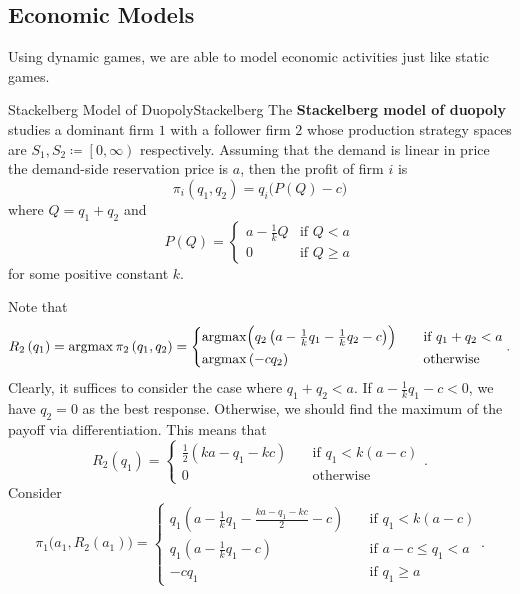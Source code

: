 \documentclass[math]{amznotes}
\theoremstyle{remark}
\DeclareMathOperator*{\argmax}{argmax}
\begin{document}
\subsection{Economic Models}
Using dynamic games, we are able to model economic activities just like static games. 
\begin{dfnbox}{Stackelberg Model of Duopoly}{Stackelberg}
    The {\color{red} \textbf{Stackelberg model of duopoly}} studies a dominant firm $1$ with a follower firm $2$ whose production strategy spaces are $S_1, S_2 \coloneqq \left[0, \infty\right)$ respectively. Assuming that the demand is linear in price the demand-side reservation price is $a$, then the profit of firm $i$ is 
    \begin{equation*}
        \pi_i\left(q_1, q_2\right) = q_i\bigl(P\left(Q\right) - c\bigr)
    \end{equation*}
    where $Q = q_1 + q_2$ and 
    \begin{equation*}
        P\left(Q\right) = \begin{cases}
            a - \frac{1}{k}Q & \textrm{if } Q < a \\
            0 & \textrm{if } Q \geq a
        \end{cases}
    \end{equation*}
    for some positive constant $k$.
\end{dfnbox}
Note that 
\begin{equation*}
    R_2\left(q_1\right) = \argmax \pi_2\left(q_1, q_2\right) = \begin{cases}
        \argmax \Bigl(q_2\left(a - \frac{1}{k}q_1 - \frac{1}{k}q_2 - c\right)\Bigr) & \quad\textrm{if } q_1 + q_2 < a \\
        \argmax \left(-cq_2\right) & \quad\textrm{otherwise}
    \end{cases}.
\end{equation*}
Clearly, it suffices to consider the case where $q_1 + q_2 < a$. If $a - \frac{1}{k}q_1 - c < 0$, we have $q_2 = 0$ as the best response. Otherwise, we should find the maximum of the payoff via differentiation. This means that 
\begin{equation*}
    R_2\left(q_1\right) = \begin{cases}
        \frac{1}{2}\left(ka - q_1 - kc\right) & \quad\textrm{if } q_1 < k\left(a - c\right) \\
        0 & \quad\textrm{otherwise}
    \end{cases}.
\end{equation*}
Consider 
\begin{equation*}
    \pi_1\bigl(a_1, R_2\left(a_1\right)\bigr) = \begin{cases}
        q_1\left(a - \frac{1}{k}q_1 - \frac{ka - q_1 - kc}{2} - c\right) & \quad\textrm{if } q_1 < k\left(a - c\right) \\
        q_1\left(a - \frac{1}{k}q_1 - c\right) & \quad\textrm{if } a - c \leq q_1 < a \\
        -cq_1 & \quad\textrm{if } q_1 \geq a
    \end{cases}.
\end{equation*}
\end{document}
